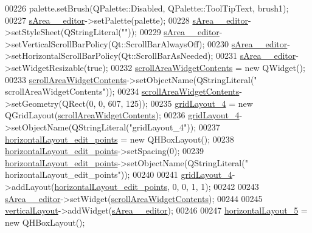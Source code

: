 \begin{DoxyCode}
00226         palette.setBrush(QPalette::Disabled, QPalette::ToolTipText, brush1);
00227         \hyperlink{a00026_a6f79b6b1fe81457d76b076a543ee4089}{sArea\_\_editor}->setPalette(palette);
00228         \hyperlink{a00026_a6f79b6b1fe81457d76b076a543ee4089}{sArea\_\_editor}->setStyleSheet(QStringLiteral(\textcolor{stringliteral}{""}));
00229         \hyperlink{a00026_a6f79b6b1fe81457d76b076a543ee4089}{sArea\_\_editor}->setVerticalScrollBarPolicy(Qt::ScrollBarAlwaysOff);
00230         \hyperlink{a00026_a6f79b6b1fe81457d76b076a543ee4089}{sArea\_\_editor}->setHorizontalScrollBarPolicy(Qt::ScrollBarAsNeeded);
00231         \hyperlink{a00026_a6f79b6b1fe81457d76b076a543ee4089}{sArea\_\_editor}->setWidgetResizable(\textcolor{keyword}{true});
00232         \hyperlink{a00026_a2fd25ae1a2b71980cbe9b9ba2751da3b}{scrollAreaWidgetContents} = \textcolor{keyword}{new} QWidget();
00233         \hyperlink{a00026_a2fd25ae1a2b71980cbe9b9ba2751da3b}{scrollAreaWidgetContents}->setObjectName(QStringLiteral(\textcolor{stringliteral}{"
      scrollAreaWidgetContents"}));
00234         \hyperlink{a00026_a2fd25ae1a2b71980cbe9b9ba2751da3b}{scrollAreaWidgetContents}->setGeometry(QRect(0, 0, 607, 125));
00235         \hyperlink{a00026_a8e397832e536976b6717e1d509226b8d}{gridLayout\_4} = \textcolor{keyword}{new} QGridLayout(\hyperlink{a00026_a2fd25ae1a2b71980cbe9b9ba2751da3b}{scrollAreaWidgetContents});
00236         \hyperlink{a00026_a8e397832e536976b6717e1d509226b8d}{gridLayout\_4}->setObjectName(QStringLiteral(\textcolor{stringliteral}{"gridLayout\_4"}));
00237         \hyperlink{a00026_ae08b661288ecee049945e4a63d0c0af0}{horizontalLayout\_edit\_points} = \textcolor{keyword}{new} QHBoxLayout();
00238         \hyperlink{a00026_ae08b661288ecee049945e4a63d0c0af0}{horizontalLayout\_edit\_points}->setSpacing(0);
00239         \hyperlink{a00026_ae08b661288ecee049945e4a63d0c0af0}{horizontalLayout\_edit\_points}->setObjectName(QStringLiteral(\textcolor{stringliteral}{"
      horizontalLayout\_edit\_points"}));
00240 
00241         \hyperlink{a00026_a8e397832e536976b6717e1d509226b8d}{gridLayout\_4}->addLayout(\hyperlink{a00026_ae08b661288ecee049945e4a63d0c0af0}{horizontalLayout\_edit\_points}, 0, 0,
       1, 1);
00242 
00243         \hyperlink{a00026_a6f79b6b1fe81457d76b076a543ee4089}{sArea\_\_editor}->setWidget(\hyperlink{a00026_a2fd25ae1a2b71980cbe9b9ba2751da3b}{scrollAreaWidgetContents});
00244 
00245         \hyperlink{a00026_a11b9c1ae90724f0bcd67c76045c93704}{verticalLayout}->addWidget(\hyperlink{a00026_a6f79b6b1fe81457d76b076a543ee4089}{sArea\_\_editor});
00246 
00247         \hyperlink{a00026_ade915b192b206af66ce1fb317087ffb6}{horizontalLayout\_5} = \textcolor{keyword}{new} QHBoxLayout();

\end{DoxyCode}
